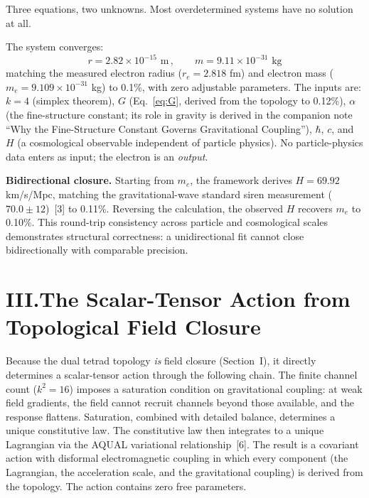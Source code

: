 \documentclass[11pt]{article}
\begin{document}
Three equations, two unknowns.
Most overdetermined systems have no solution at all.

The system converges:
\begin{equation*}
r = 2.82 \times 10^{-15}\text{ m}\,,\qquad m = 9.11 \times 10^{-31}\text{ kg}
\end{equation*}
matching the measured electron radius ($r_e = 2.818$ fm) and electron mass ($m_e = 9.109 \times 10^{-31}$ kg) to 0.1\%, with zero adjustable parameters.
The inputs are: $k = 4$ (simplex theorem), $G$ (Eq.~\ref{eq:G}, derived from the topology to 0.12\%), $\alpha$ (the fine-structure constant; its role in gravity is derived in the companion note ``Why the Fine-Structure Constant Governs Gravitational Coupling''), $\hbar$, $c$, and $H$ (a cosmological observable independent of particle physics).
No particle-physics data enters as input; the electron is an \emph{output}.

\textbf{Bidirectional closure.}\quad
Starting from $m_e$, the framework derives $H = 69.92$ km/s/Mpc, matching the gravitational-wave standard siren measurement ($70.0 \pm 12$)~[3] to 0.11\%.
Reversing the calculation, the observed $H$ recovers $m_e$ to 0.10\%.
This round-trip consistency across particle and cosmological scales demonstrates structural correctness: a unidirectional fit cannot close bidirectionally with comparable precision.

\section*{III.\quad The Scalar-Tensor Action from Topological Field Closure}

Because the dual tetrad topology \emph{is} field closure (Section~I), it directly determines a scalar-tensor action through the following chain.
The finite channel count ($k^2 = 16$) imposes a saturation condition on gravitational coupling: at weak field gradients, the field cannot recruit channels beyond those available, and the response flattens.
Saturation, combined with detailed balance, determines a unique constitutive law.
The constitutive law then integrates to a unique Lagrangian via the AQUAL variational relationship~[6].
The result is a covariant action with disformal electromagnetic coupling in which every component (the Lagrangian, the acceleration scale, and the gravitational coupling) is derived from the topology.
The action contains zero free parameters.
\end{document}
